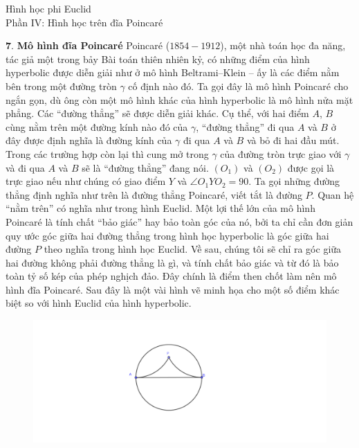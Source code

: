 {Hình học phi Euclid\\
Phần IV: Hình học trên đĩa Poincaré}
 
	\vskip 0.1cm
	$\pmb{7.}$ \textbf{\color{lichsutoanhoc}Mô hình đĩa Poincar\'e}
	\vskip 0.1cm
 Poincar\'e ($1854 - 1912$), một nhà toán học đa năng, tác giả một trong bảy Bài toán thiên nhiên kỷ, có những điểm của hình hyperbolic được diễn giải như ở mô hình Beltrami--Klein -- ấy là các điểm nằm bên trong một đường tròn $\gamma $ cố định nào đó. Ta gọi đây là mô hình Poincar\'e cho ngắn gọn, dù ông còn một mô hình khác của hình hyperbolic là mô hình nửa mặt phẳng. 
 	\vskip 0.1cm
	Các ``đường thẳng'' sẽ được diễn giải khác. Cụ thể, với hai điểm $A$, $B$ cùng nằm trên một đường kính nào đó của $\gamma$, ``đường thẳng'' đi qua $A$ và $B$ ở đây được định nghĩa là đường kính của $\gamma$ đi qua $A$ và $B$ và bỏ đi hai đầu mút. Trong các trường hợp còn lại thì cung mở trong $\gamma$ của đường tròn trực giao với $\gamma$ và đi qua $A$ và $B$ sẽ là ``đường thẳng'' đang nói. $(O_1)$ và $(O_2)$ được gọi là trực giao nếu như chúng có giao điểm $Y$ và $ \angle O_1YO_2 = 90$. Ta gọi những đường thẳng định nghĩa như trên là đường thẳng Poincaré, viết tắt là đường $P$. 
		\vskip 0.1cm
	Quan hệ ``nằm trên'' có nghĩa như trong hình Euclid. Một lợi thế lớn của mô hình Poincar\'e là tính chất ``bảo giác'' hay bảo toàn góc của nó, bởi ta chỉ cần đơn giản quy ước góc giữa hai đường thẳng trong hình học hyperbolic là góc giữa hai đường  $P$ theo nghĩa trong hình học Euclid. Về sau, chúng tôi sẽ chỉ ra góc giữa hai đường không phải đường thẳng là gì, và tính chất bảo giác và từ đó là bảo toàn tỷ số kép của phép nghịch đảo. Đây chính là điểm then chốt làm nên mô hình đĩa Poincar\'e.
		\vskip 0.1cm
	Sau đây là một vài hình vẽ minh họa cho một số điểm khác biệt so với hình Euclid của hình hyperbolic.
\vskip 0.1cm
\begin{figure}[ht]
\includegraphics[width=\textwidth]{Duong_song_song_gioi_han_Poincare.pdf}
\end{figure}

